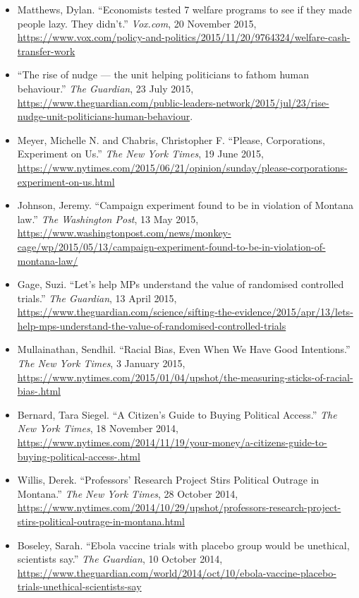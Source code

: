 \documentclass[12pt,a4paper]{article}
\begin{document}
\begin{itemize}
\item Matthews, Dylan. ``Economists tested 7 welfare programs to see if they made people lazy. They didn't.'' \textit{Vox.com}, 20 November 2015, \url{https://www.vox.com/policy-and-politics/2015/11/20/9764324/welfare-cash-transfer-work}

\item ``The rise of nudge --- the unit helping politicians to fathom human behaviour.'' \textit{The Guardian}, 23 July 2015, \url{https://www.theguardian.com/public-leaders-network/2015/jul/23/rise-nudge-unit-politicians-human-behaviour}.

\item Meyer, Michelle N. and Chabris, Christopher F. ``Please, Corporations, Experiment on Us.'' \textit{The New York Times}, 19 June 2015, \url{https://www.nytimes.com/2015/06/21/opinion/sunday/please-corporations-experiment-on-us.html}

\item Johnson, Jeremy. ``Campaign experiment found to be in violation of Montana law.'' \textit{The Washington Post}, 13 May 2015, \url{https://www.washingtonpost.com/news/monkey-cage/wp/2015/05/13/campaign-experiment-found-to-be-in-violation-of-montana-law/}

\item Gage, Suzi. ``Let's help MPs understand the value of randomised controlled trials.'' \textit{The Guardian}, 13 April 2015, \url{https://www.theguardian.com/science/sifting-the-evidence/2015/apr/13/lets-help-mps-understand-the-value-of-randomised-controlled-trials}

\item Mullainathan, Sendhil. ``Racial Bias, Even When We Have Good Intentions.'' \textit{The New York Times}, 3 January 2015, \url{https://www.nytimes.com/2015/01/04/upshot/the-measuring-sticks-of-racial-bias-.html}

\item Bernard, Tara Siegel. ``A Citizen's Guide to Buying Political Access.'' \textit{The New York Times}, 18 November 2014, \url{https://www.nytimes.com/2014/11/19/your-money/a-citizens-guide-to-buying-political-access-.html}

\item Willis, Derek. ``Professors' Research Project Stirs Political Outrage in Montana.'' \textit{The New York Times}, 28 October 2014, \url{https://www.nytimes.com/2014/10/29/upshot/professors-research-project-stirs-political-outrage-in-montana.html}

\item Boseley, Sarah. ``Ebola vaccine trials with placebo group would be unethical, scientists say.'' \textit{The Guardian}, 10 October 2014, \url{https://www.theguardian.com/world/2014/oct/10/ebola-vaccine-placebo-trials-unethical-scientists-say}


\end{itemize}
\end{document}
